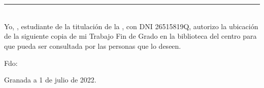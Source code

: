 \chapter*{}

\thispagestyle{empty}

\noindent\rule[-1ex]{\textwidth}{2pt}\\[4.5ex]

Yo, \textbf{\myName}, estudiante de la titulación \myDegree de la \textbf{\myFaculty}, con DNI 26515819Q, autorizo la ubicación de la siguiente copia de mi Trabajo Fin de Grado en la biblioteca del centro para que pueda ser consultada por las personas que lo deseen.

\vspace{6cm}

\noindent Fdo: \myName

\vspace{2cm}

\begin{flushright}
Granada a 1 de julio de 2022.
\end{flushright}
